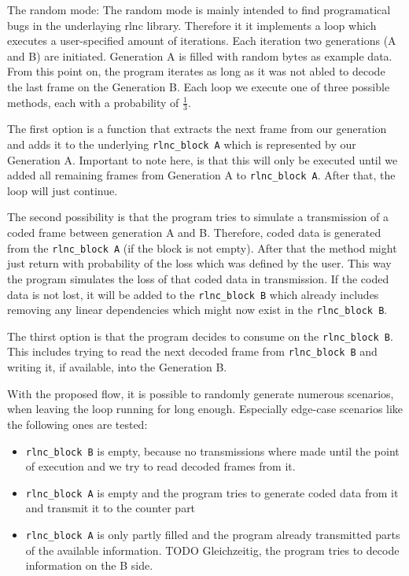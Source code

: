 \documentclass[a4paper,english,10pt]{tumarticle}
\begin{document}
The random mode:
The random mode is mainly intended to find programatical bugs in the underlaying rlnc library. Therefore it it implements a
loop which executes a user-specified amount of iterations. Each iteration two generations (A and B) are initiated. Generation A
is filled with random bytes as example data. From this point on, the program iterates as long as it was not abled to decode the last 
frame on the Generation B. Each loop we execute one of three possible methods, each with a probability of $\frac{1}{3}$.

The first option is a function that extracts the next frame from our generation and adds it to the underlying \texttt{rlnc\_block A}
which is represented by our Generation A. Important to note here, is that this will only be executed until we added all remaining frames
from Generation A to \texttt{rlnc\_block A}. After that, the loop will just continue.

The second possibility is that the program tries to simulate a transmission of a coded frame between generation
A and B. Therefore, coded data is generated from the \texttt{rlnc\_block A} (if the block is not empty). After that the method might just return with
probability of the loss which was defined by the user. This way the program simulates the loss of that coded data in transmission. If the coded data is not
lost, it will be added to the \texttt{rlnc\_block B} which already includes removing any linear dependencies which might now exist in the \texttt{rlnc\_block B}.

The thirst option is that the program decides to consume on the \texttt{rlnc\_block B}. This includes trying to read the next decoded frame from 
\texttt{rlnc\_block B} and writing it, if available, into the Generation B.

With the proposed flow, it is possible to randomly generate numerous scenarios, when leaving the loop running for long enough. 
Especially edge-case scenarios like the following ones are tested:

\begin{itemize}
  \item \texttt{rlnc\_block B} is empty, because no transmissions where made until the point of execution and we try to read decoded frames from it.
  \item \texttt{rlnc\_block A} is empty and the program tries to generate coded data from it and transmit it to the counter part
  \item \texttt{rlnc\_block A} is only partly filled and the program already transmitted parts of the available information. TODO Gleichzeitig, 
  the program tries to decode information on the B side.
\end{itemize}
\end{document}
